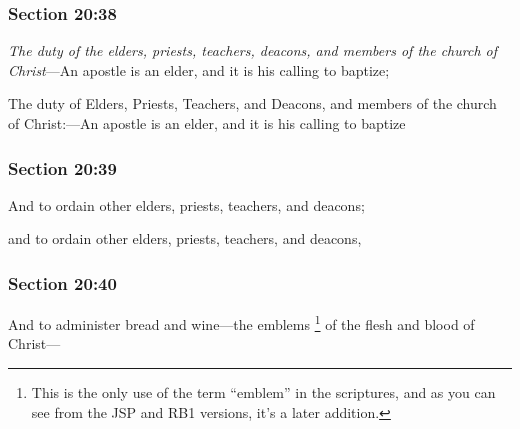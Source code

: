 	\subsubsection{Section 20:38} %
		\label{DC20-38}

		\textit{The duty of the elders, priests, teachers, deacons, and members of the church of Christ}---An apostle is an elder, and it is his calling to baptize;

		\begin{framed}
		\scriptsize
			\begin{compactdesc}
				\item[JSP] The duty of Elders, Priests, Teachers, and Deacons, and members of the church of Christ:---An apostle is an elder, and it is his calling to baptize 
				\item[RB1] 
				\item[BC] 
			\end{compactdesc}
		\end{framed}

	\subsubsection{Section 20:39} %
		\label{DC20-39}

		And to ordain other elders, priests, teachers, and deacons;

		\begin{framed}
		\scriptsize
			\begin{compactdesc}
				\item[JSP] and to ordain other elders, priests, teachers, and deacons, 
				\item[RB1] 
				\item[BC] 
			\end{compactdesc}
		\end{framed}

	\subsubsection{Section 20:40} %
		\label{DC20-40}

		And to administer bread and wine---the emblems%
			\footnote{%
				This is the only use of the term ``emblem'' in the scriptures, and as you can see from the JSP and RB1 versions, it's a later addition. 
				}
		of the flesh and blood of Christ---

